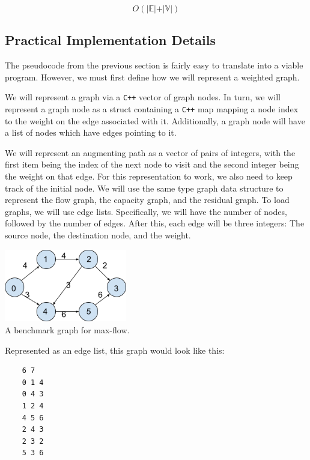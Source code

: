 \documentclass[12pt]{amsart}
\begin{document}
    \[
        O( \vert \mathbb{E} \vert + \vert \mathbb{V} \vert )
    \]

\subsection{Practical Implementation Details}

    The pseudocode from the previous section is fairly easy to
    translate into a viable program. However, we must first
    define how we will represent a weighted graph.

    We will represent a graph via a \verb|C++| vector of graph
    nodes. In turn, we will represent a graph node as a struct
    containing a \verb|C++| map mapping a node index to the
    weight on the edge associated with it. Additionally, a graph
    node will have a list of nodes which have edges pointing to
    it.

    We will represent an augmenting path as a vector of pairs of
    integers, with the first item being the index of the next
    node to visit and the second integer being the weight on
    that edge. For this representation to work, we also need to
    keep track of the initial node. We will use the same type
    graph data structure to represent the flow graph, the
    capacity graph, and the residual graph. To load graphs, we
    will use edge lists. Specifically, we will have the number
    of nodes, followed by the number of edges. After this, each
    edge will be three integers: The source node, the
    destination node, and the weight.

\begin{center}
    \includegraphics[width=0.4\textwidth]{graph} \\
    A benchmark graph for max-flow. \\
    \vskip 1cm
\end{center}

    Represented as an edge list, this graph would look like
    this:

\begin{verbatim}
    6 7
    0 1 4
    0 4 3
    1 2 4
    4 5 6
    2 4 3
    2 3 2
    5 3 6
\end{verbatim}
\end{document}
